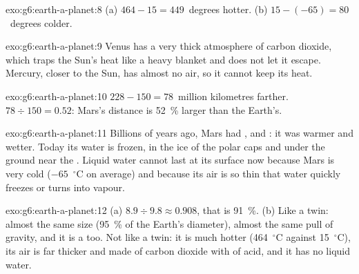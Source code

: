 \begin{solution}{exo:g6:earth-a-planet:8}
(a) $464 - 15 = 449$~degrees hotter. (b) $15 - (-65) = 80$~degrees colder.
\end{solution}

\begin{solution}{exo:g6:earth-a-planet:9}
Venus has a very thick atmosphere of carbon dioxide, which traps the Sun's
heat like a heavy blanket and does not let it escape. Mercury, closer to the
Sun, has almost no air, so it cannot keep its heat.
\end{solution}

\begin{solution}{exo:g6:earth-a-planet:10}
$228 - 150 = 78$~million kilometres farther. $78 \div 150 = 0.52$: Mars's
distance is 52~\% larger than the Earth's.
\end{solution}

\begin{solution}{exo:g6:earth-a-planet:11}
Billions of years ago, Mars had ,  and : it was warmer and
wetter. Today its water is frozen, in the ice of the polar caps and under
the ground near the . Liquid water cannot last at its surface now
because Mars is very cold ($-65$~$^\circ$C on average) and because its air
is so thin that water quickly freezes or turns into vapour.
\end{solution}

\begin{solution}{exo:g6:earth-a-planet:12}
(a) $8.9 \div 9.8 \approx 0.908$, that is 91~\%. (b) Like a twin: almost
the same size (95~\% of the Earth's diameter), almost the same pull of
gravity, and it is a  too. Not like a twin: it is much hotter
(464~$^\circ$C against 15~$^\circ$C), its air is far thicker and made of
carbon dioxide with  of acid, and it has no liquid water.
\end{solution}

